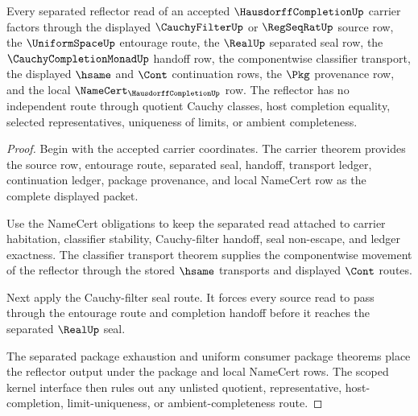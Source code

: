 \begin{theorem}
\label{thm:hausdorff-completion-separated-reflector-route}
Every separated reflector read of an accepted $\HausdorffCompletionUp$ carrier factors through the displayed $\CauchyFilterUp$ or $\RegSeqRatUp$ source row, the $\UniformSpaceUp$ entourage route, the $\RealUp$ separated seal row, the $\CauchyCompletionMonadUp$ handoff row, the componentwise classifier transport, the displayed $\hsame$ and $\Cont$ continuation rows, the $\Pkg$ provenance row, and the local $\NameCert_{\HausdorffCompletionUp}$ row. The reflector has no independent route through quotient Cauchy classes, host completion equality, selected representatives, uniqueness of limits, or ambient completeness.
\end{theorem}
\begin{proof}
Begin with the accepted carrier coordinates. The carrier theorem provides the source row, entourage route, separated seal, handoff, transport ledger, continuation ledger, package provenance, and local NameCert row as the complete displayed packet.

Use the NameCert obligations to keep the separated read attached to carrier habitation, classifier stability, Cauchy-filter handoff, seal non-escape, and ledger exactness. The classifier transport theorem supplies the componentwise movement of the reflector through the stored $\hsame$ transports and displayed $\Cont$ routes.

Next apply the Cauchy-filter seal route. It forces every source read to pass through the entourage route and completion handoff before it reaches the separated $\RealUp$ seal.

The separated package exhaustion and uniform consumer package theorems place the reflector output under the package and local NameCert rows. The scoped kernel interface then rules out any unlisted quotient, representative, host-completion, limit-uniqueness, or ambient-completeness route.
\end{proof}

